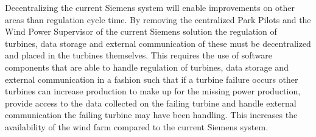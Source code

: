 Decentralizing the current Siemens system will enable improvements on other areas than regulation cycle time. By removing the centralized Park Pilots and the Wind Power Supervisor of the current Siemens solution the regulation of turbines, data storage and external communication of these must be decentralized and placed in the turbines themselves. This requires the use of software components that are able to handle regulation of turbines, data storage and external communication in a fashion such that if a turbine failure occurs other turbines can increase production to make up for the missing power production, provide access to the data collected on the failing turbine and handle external communication the failing turbine may have been handling. This increases the availability of the wind farm compared to the current Siemens system.


